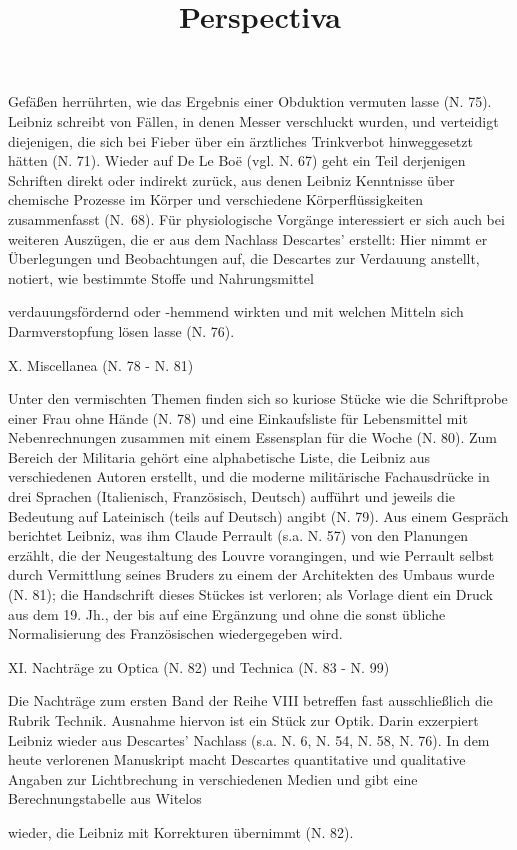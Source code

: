 Gefä{\ss}en herrührten, wie das Ergebnis einer Obduktion vermuten lasse (N. 75). Leibniz schreibt von Fällen, in denen Messer verschluckt wurden, und verteidigt diejenigen, die sich bei Fieber über ein ärztliches Trinkverbot hinweggesetzt hätten (N. 71). Wieder auf De Le Boë (vgl. N. 67) geht ein Teil derjenigen Schriften direkt oder indirekt zurück, aus denen Leibniz Kenntnisse über chemische Prozesse im Körper und verschiedene Körperflüssigkeiten zusammenfasst (N.~68). Für physiologische Vorgänge interessiert er sich auch bei weiteren Auszügen, die er aus dem Nachlass Descartes' erstellt: Hier nimmt er Überlegungen und Beobachtungen auf, die Descartes zur Verdauung anstellt, notiert, wie bestimmte Stoffe und Nahrungsmittel  \par\newpage\noindent 
 verdauungsfördernd oder -hemmend wirkten und mit welchen Mitteln sich Darmverstopfung lösen lasse (N. 76). 
\par
\vspace{3.0ex}
\noindent
X. Miscellanea (N. 78 - N. 81)
\vspace{1.0ex}
\par\noindent
Unter den vermischten Themen finden sich so kuriose Stücke wie die Schriftprobe einer Frau ohne Hände (N. 78) und eine Einkaufsliste für Lebensmittel mit Nebenrechnungen zusammen mit einem Essensplan für die Woche (N. 80). Zum Bereich der Militaria gehört eine alphabetische Liste, die Leibniz aus verschiedenen Autoren erstellt, und die moderne militärische Fachausdrücke in drei Sprachen (Italienisch, Französisch, Deutsch) aufführt und jeweils die Bedeutung auf Lateinisch (teils auf Deutsch) angibt (N. 79). Aus einem Gespräch berichtet Leibniz, was ihm Claude Perrault (s.a. N. 57) von den Planungen erzählt, die der Neugestaltung des Louvre vorangingen, und wie Perrault selbst durch Vermittlung seines Bruders zu einem der Architekten des Umbaus wurde (N. 81); die Handschrift dieses Stückes ist verloren; als Vorlage dient ein Druck aus dem 19. Jh., der bis auf eine Ergänzung und ohne die sonst übliche Normalisierung des Französischen wiedergegeben wird. 
\par
\vspace{3.0ex}
\noindent
XI. Nachträge zu Optica (N. 82) und Technica (N. 83 - N. 99) 
\vspace{1.0ex}
\par\noindent
Die Nachträge zum ersten Band der Reihe VIII betreffen fast ausschlie{\ss}lich die Rubrik Technik. Ausnahme hiervon ist ein Stück zur Optik. Darin exzerpiert Leibniz wieder aus Descartes' Nachlass (s.a. N. 6, N. 54, N. 58, N. 76). In dem heute verlorenen Manuskript macht Descartes quantitative und qualitative Angaben zur Lichtbrechung in verschiedenen Medien und gibt eine Berechnungstabelle aus Witelos \title{Perspectiva} wieder, die Leibniz mit Korrekturen übernimmt (N. 82). 
